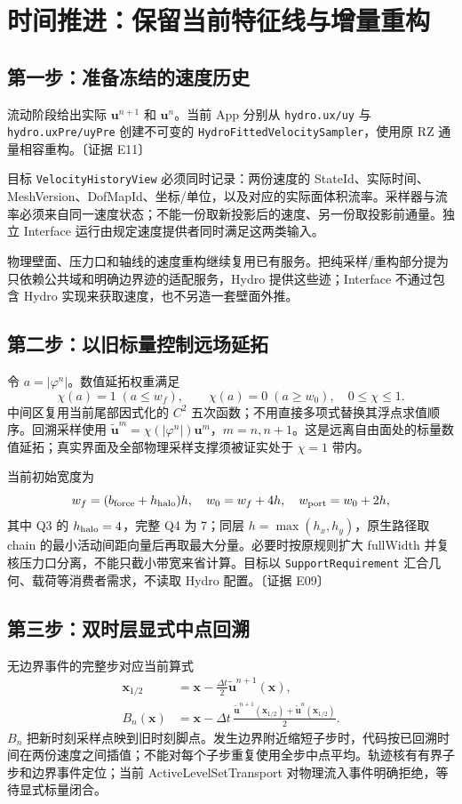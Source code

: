 \documentclass[UTF8,a4paper,11pt,fontset=fandol]{ctexart}
\newcommand{\code}[1]{\nolinkurl{#1}}
\newcommand{\ev}[1]{{\small\color{muted}〔证据 #1〕}}
\newcommand{\uu}{\bm u}\newcommand{\nn}{\bm n}\newcommand{\xx}{\bm x}
\newcommand{\ph}{\varphi}\newcommand{\dt}{\Delta t}
\begin{document}
\section{时间推进：保留当前特征线与增量重构}
\subsection{第一步：准备冻结的速度历史}
流动阶段给出实际 $\uu^{n+1}$ 和 $\uu^n$。当前 App 分别从 \code{hydro.ux/uy} 与 \code{hydro.uxPre/uyPre} 创建不可变的 \code{HydroFittedVelocitySampler}，使用原 RZ 通量相容重构。\ev{E11}

目标 \code{VelocityHistoryView} 必须同时记录：两份速度的 StateId、实际时间、MeshVersion、DofMapId、坐标/单位，以及对应的实际面体积流率。采样器与流率必须来自同一速度状态；不能一份取新投影后的速度、另一份取投影前通量。独立 Interface 运行由规定速度提供者同时满足这两类输入。

物理壁面、压力口和轴线的速度重构继续复用已有服务。把纯采样/重构部分提为只依赖公共域和明确边界迹的适配服务，Hydro 提供这些迹；Interface 不通过包含 Hydro 实现来获取速度，也不另造一套壁面外推。

\subsection{第二步：以旧标量控制远场延拓}
令 $a=|\ph^n|$。数值延拓权重满足
\[
 \chi(a)=1\;(a\le w_f),\qquad \chi(a)=0\;(a\ge w_0),
 \quad 0\le\chi\le1.
\]
中间区复用当前尾部因式化的 $C^2$ 五次函数；不用直接多项式替换其浮点求值顺序。回溯采样使用 $\widetilde{\uu}^m=\chi(|\ph^n|)\uu^m$，$m=n,n+1$。这是远离自由面处的标量数值延拓；真实界面及全部物理采样支撑须被证实处于 $\chi=1$ 带内。

当前初始宽度为
\begin{equation}
 w_f=(b_{\rm force}+h_{\rm halo})h,\quad w_0=w_f+4h,
 \quad w_{\rm port}=w_0+2h,
\end{equation}
其中 Q3 的 $h_{\rm halo}=4$，完整 Q4 为 7；同层 $h=\max(h_x,h_y)$，原生路径取 chain 的最小活动间距向量后再取最大分量。必要时按原规则扩大 fullWidth 并复核压力口分离，不能只截小带宽来省计算。目标以 \code{SupportRequirement} 汇合几何、载荷等消费者需求，不读取 Hydro 配置。\ev{E09}

\subsection{第三步：双时层显式中点回溯}
无边界事件的完整步对应当前算式
\begin{align}
 \xx_{1/2}&=\xx-\frac{\dt}{2}\widetilde{\uu}^{n+1}(\xx),\\
 B_n(\xx)&=\xx-\dt\,
 \frac{\widetilde{\uu}^{n+1}(\xx_{1/2})+
       \widetilde{\uu}^{n}(\xx_{1/2})}{2}.
 \label{eq:backtrace}
\end{align}
$B_n$ 把新时刻采样点映到旧时刻脚点。发生边界附近缩短子步时，代码按已回溯时间在两份速度之间插值；不能对每个子步重复使用全步中点平均。轨迹核有有界子步和边界事件定位；当前 ActiveLevelSetTransport 对物理流入事件明确拒绝，等待显式标量闭合。
\end{document}
